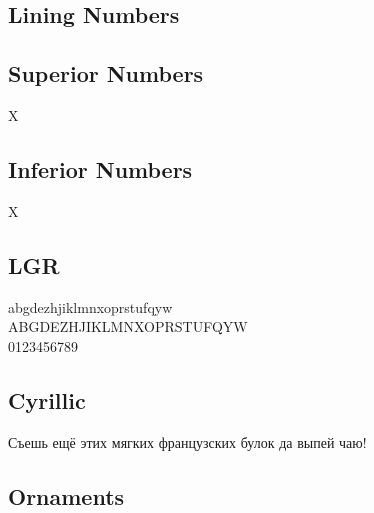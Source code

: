\documentclass[12pt]{article}
\begin{document}
{}

\subsection*{Lining Numbers}

{}

\subsection*{Superior Numbers}

X

\subsection*{Inferior Numbers}

X



\subsection*{LGR}

{\garamondlibrelgr\noindent
abgdezhjiklmnxoprstufqyw\\
ABGDEZHJIKLMNXOPRSTUFQYW\\
0123456789
}


\subsection*{Cyrillic}

{\ifxetex\else\ifluatex\else{}\selectfont\fi\fi 

Съешь ещё этих мягких французских булок да
выпей чаю!}

\subsection*{Ornaments}

\end{document}
